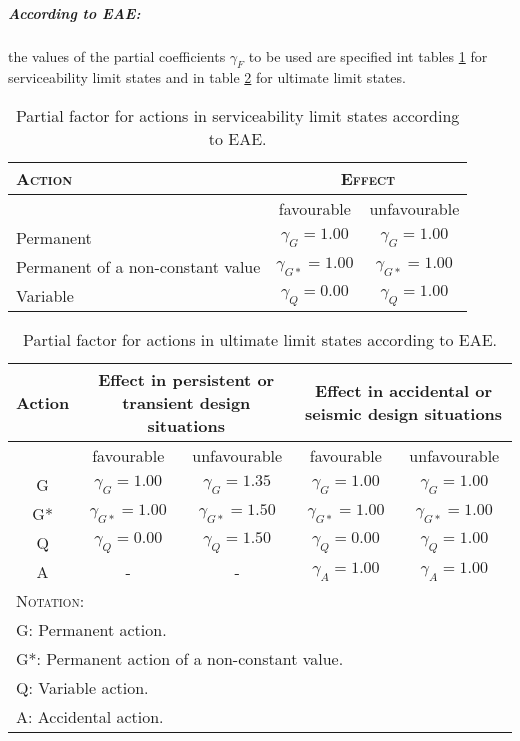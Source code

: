 \subparagraph{According to EAE:} the values of the partial coefficients $\gamma_F$ to be used are specified int tables \ref{tb_gf_ELS_EAE} for serviceability limit states and in table \ref{tb_gf_ELU_EAE} for ultimate limit states.


\begin{table}
\begin{center}
\begin{footnotesize}
\begin{tabular}{|l|c|c|}
\hline
\textsc{Action} & \multicolumn{2}{|c|}{\textsc{Effect}} \\
\hline
 & favourable & unfavourable \\
\hline
Permanent  & $\gamma_G= 1.00$ &  $\gamma_G= 1.00$ \\
\hline
Permanent of a non-constant value & $\gamma_{G*}= 1.00$ &  $\gamma_{G*}= 1.00$ \\
\hline
Variable & $\gamma_Q= 0.00$ &  $\gamma_Q= 1.00$ \\
\hline
\end{tabular}
\end{footnotesize}
\caption{Partial factor for actions in serviceability limit states according to EAE.} \label{tb_gf_ELS_EAE}
\end{center}
\end{table}

\begin{table}
\begin{center}
\begin{footnotesize}
\begin{tabular}{|c|c|c|c|c|}
\hline
Action & \multicolumn{2}{|p{4cm}|}{Effect in persistent or transient design situations} &\multicolumn{2}{|p{4cm}|}{ Effect in accidental or seismic design situations} \\
\hline
 & favourable & unfavourable & favourable & unfavourable \\
\hline
G  & $\gamma_G= 1.00$ &  $\gamma_G= 1.35$ & $\gamma_G= 1.00$ &  $\gamma_G= 1.00$ \\
\hline
G* & $\gamma_{G*}= 1.00$ &  $\gamma_{G*}= 1.50$ & $\gamma_{G*}= 1.00$ &  $\gamma_{G*}= 1.00$ \\
\hline
Q  & $\gamma_Q= 0.00$ &  $\gamma_Q= 1.50$ & $\gamma_Q= 0.00$ &  $\gamma_Q= 1.00$ \\
\hline
A  & - & - &  $\gamma_A= 1.00$ &  $\gamma_A= 1.00$ \\
\hline
\multicolumn{5}{|l|}{\textsc{Notation:}} \\
\hline
\multicolumn{5}{|l|}{G: Permanent action.} \\
\multicolumn{5}{|l|}{G*: Permanent action of a non-constant value.} \\
\multicolumn{5}{|l|}{Q: Variable action.} \\
\multicolumn{5}{|l|}{A: Accidental action.} \\
\hline
\end{tabular}
\end{footnotesize}
\caption{Partial factor for actions in ultimate limit states according to EAE.} \label{tb_gf_ELU_EAE}
\end{center}
\end{table}

